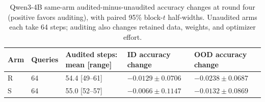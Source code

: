 \begin{table}[H]
\caption{Qwen3-4B same-arm audited-minus-unaudited accuracy changes at round four (positive favors auditing), with paired 95\% block-$t$ half-widths. Unaudited arms each take 64 steps; auditing also changes retained data, weights, and optimizer effort.}
\label{tab:qwen4b-audit-change}
\centering\small\setlength{\tabcolsep}{3pt}
\begin{tabular}{@{}lllll@{}}
\toprule
Arm & Queries & Audited steps: mean [range] & ID accuracy change & OOD accuracy change\\
\midrule
R & 64 & 54.4 [49--61] & $-0.0129\pm0.0706$ & $-0.0238\pm0.0687$\\
S & 64 & 55.0 [52--57] & $-0.0066\pm0.1147$ & $-0.0132\pm0.0869$\\
\bottomrule
\end{tabular}
\end{table}

